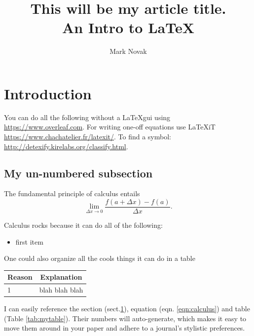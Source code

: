 \documentclass[12pt,letterpaper]{article}
\author{Mark Novak}
\title{\textbf{This will be my article title.}\\An Intro to \LaTeX}
\begin{document}
\maketitle

\tableofcontents

\pagebreak

\section{Introduction } \label{sec:intro} %

You can do all the following without a \LaTeX gui using \url{https://www.overleaf.com}.  For writing one-off equations use LaTeXiT \url{https://www.chachatelier.fr/latexit/}.  To find a symbol:  \url{http://detexify.kirelabs.org/classify.html}.

\subsection*{My un-numbered subsection}

The fundamental principle of calculus entails
\begin{equation}
	\label{eqn:calculus}
	\lim_{{\Delta x} \to 0}\frac{f(a+\Delta x)-f(a)}{\Delta x}.
\end{equation}

\noindent %
Calculus rocks because it can do all of the following:
\begin{itemize}
	\item first item
\end{itemize}

One could also organize all the cools things it can do in a table
\begin{center}
\begin{tabular}{l c} %
	\label{tab:mytable}
		Reason & Explanation\\ %
		 \hline
		1 & blah blah blah \\
 		 \hline
\end{tabular}
\end{center}

I can easily reference the section (sect.\ref{sec:intro}), equation (eqn. \ref{eqn:calculus}) and table (Table \ref{tab:mytable}).  Their numbers will auto-generate, which makes it easy to move them around in your paper and adhere to a journal's stylistic preferences.
\end{document}
